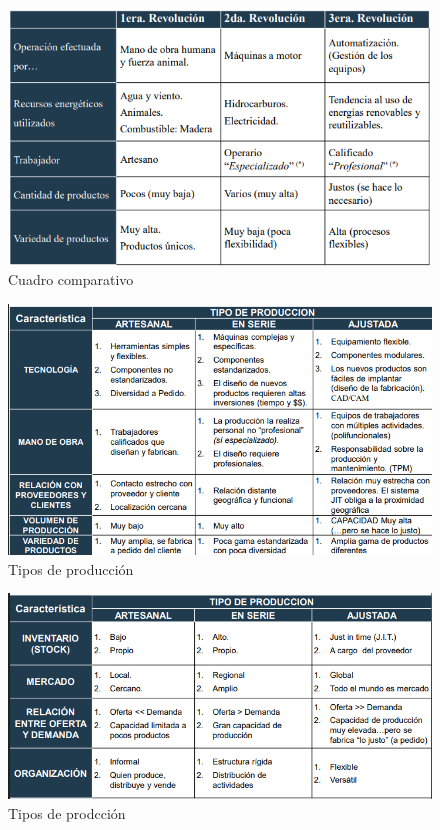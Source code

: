 \documentclass[a4paper,oneside,11pt]{article}
\begin{document}
\begin{figure} [ht!]
    \centering
    \includegraphics[scale=1]{evolucion_industrial.png}
    \caption{Cuadro comparativo}
\end{figure}

\begin{figure} [ht!]
    \centering
    \includegraphics[scale=.85]{produccion.png}
    \caption{Tipos de producción}
\end{figure}

\begin{figure} [ht!]
    \centering
    \includegraphics[scale=.85]{prod2.png}
    \caption{Tipos de prodcción}
\end{figure}
\end{document}
